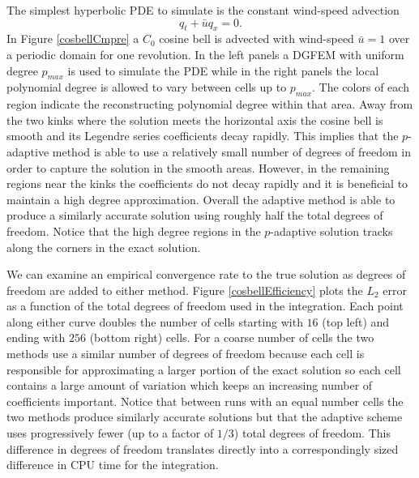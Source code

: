 \documentclass[10]{amsart}
\begin{document}
The simplest hyperbolic PDE to simulate is the constant wind-speed advection 
\begin{equation*}
q_t + \bar{u} q_x  = 0.
\end{equation*}
In Figure \ref{cosbellCmpre} a $C_0$ cosine bell is advected with wind-speed $\bar{u} = 1$ over a periodic domain for one revolution. In the left panels a DGFEM with uniform degree $p_{max}$ is used to simulate the PDE while in the right panels the local polynomial degree is allowed to vary between cells up to $p_{max}$. The colors of each region indicate the reconstructing polynomial degree within that area. Away from the two kinks where the solution meets the horizontal axis the cosine bell is smooth and its Legendre series coefficients decay rapidly. This implies that the $p$-adaptive method is able to use a relatively small number of degrees of freedom in order to capture the solution in the smooth areas. However, in the remaining regions near the kinks the coefficients do not decay rapidly and it is beneficial to maintain a high degree approximation. Overall the adaptive method is able to produce a similarly accurate solution using roughly half the total degrees of freedom. Notice that the high degree 
regions in the $p$-adaptive solution tracks along the corners in the exact solution. 

We can examine an empirical convergence rate to the true solution as degrees of freedom are added to either method. Figure \ref{cosbellEfficiency} plots the $L_2$ error as a function of the total degrees of freedom used in the integration. Each point along either curve doubles the number of cells starting with $16$ (top left) and ending with $256$ (bottom right) cells. For a coarse number of cells the two methods use a similar number of degrees of freedom because each cell is responsible for approximating a larger portion of the exact solution so each cell contains a large amount of variation which keeps an increasing number of coefficients important. Notice that between runs with an equal number cells the two methods produce similarly accurate solutions but that the adaptive scheme uses progressively fewer (up to a factor of $1/3$) total degrees of freedom. This difference in degrees of freedom translates directly into a correspondingly sized difference in CPU time for the integration.
\end{document}

